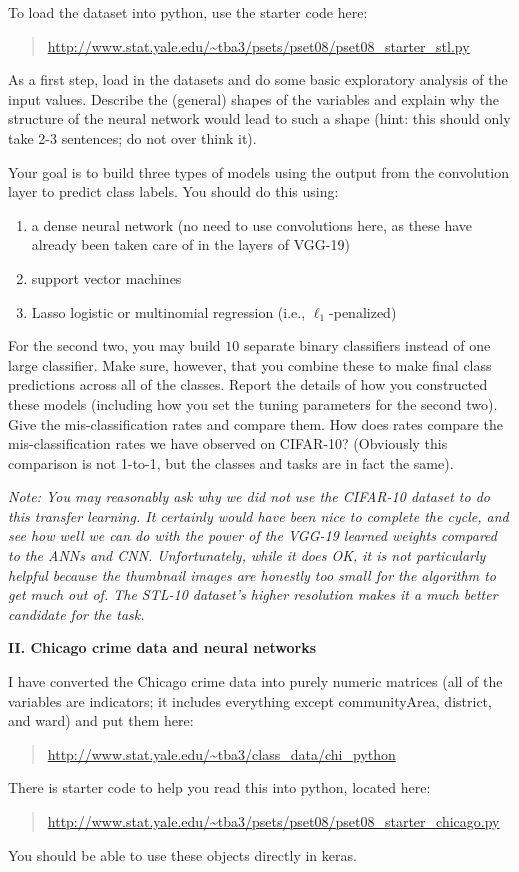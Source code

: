 \documentclass[12pt]{article}
\begin{document}
To load the dataset into python, use the starter code here:
\begin{quote}
\url{http://www.stat.yale.edu/~tba3/psets/pset08/pset08_starter_stl.py}
\end{quote}

As a first step, load in the datasets and do some basic exploratory analysis
of the input values. Describe the (general) shapes of the variables and
explain why the structure of the neural network would lead to such a
shape (hint: this should only take 2-3 sentences; do not over think it).

Your goal is to build three types of models using the output from the
convolution layer to predict class labels. You should do this using:
\begin{enumerate}
\item a dense neural network (no need to use convolutions here, as these have
already been taken care of in the layers of VGG-19)
\item support vector machines
\item Lasso logistic or multinomial regression (i.e., $\ell_1$-penalized)
\end{enumerate}
For the second two, you may build $10$ separate binary classifiers instead
of one large classifier. Make sure, however, that you combine these to
make final class predictions across all of the classes. Report the details of
how you constructed these models (including how you set the tuning parameters
for the second two). Give the mis-classification rates and compare them.
How does rates compare the mis-classification rates we have observed on
CIFAR-10? (Obviously this comparison is not 1-to-1, but the classes
and tasks are in fact the same).

\textit{Note: You may reasonably ask why we did not use the CIFAR-10 dataset
to do this transfer learning. It certainly would have been nice to
complete the cycle, and see how well we can do with the power of the VGG-19
learned weights compared to the ANNs and CNN. Unfortunately, while it does OK,
it is not particularly helpful because the thumbnail images are honestly too
small for the algorithm to get much out of. The STL-10 dataset's higher
resolution makes it a much better candidate for the task.}

\textbf{II. Chicago crime data and neural networks}

I have converted the Chicago crime data into purely numeric matrices
(all of the variables are indicators; it includes everything
except communityArea, district, and ward) and put them here:
\begin{quote}
\url{http://www.stat.yale.edu/~tba3/class_data/chi_python}
\end{quote}
There is starter code to help you read this into python, located
here:
\begin{quote}
\url{http://www.stat.yale.edu/~tba3/psets/pset08/pset08_starter_chicago.py}
\end{quote}
You should be able to use these objects directly in keras.
\end{document}
